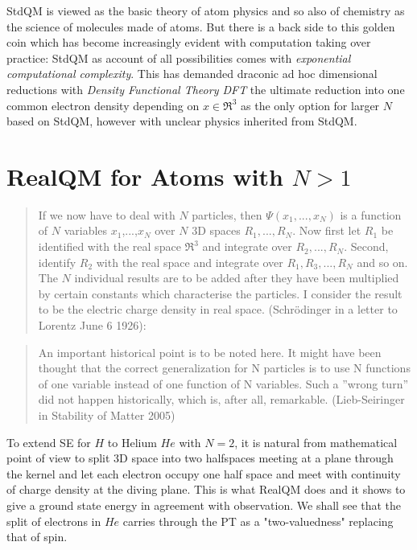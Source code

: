 \documentclass[11pt]{article} %
\begin{document}
StdQM is viewed as the basic theory of atom physics and so also of chemistry as the science of molecules made of atoms.  But there is a back side to this golden coin which has become increasingly evident with computation taking over practice: StdQM as account of all possibilities comes with  \emph{exponential computational complexity}. This  
has demanded draconic ad hoc dimensional reductions with \emph{Density Functional Theory DFT} the ultimate reduction into one common electron density depending on $x\in\Re^3$ as the only option for larger $N$ based on StdQM,  however with unclear physics inherited from StdQM.

\section{RealQM for Atoms with $N>1$}
\begin{quote}
If we now have to deal with $N$ particles, then $\Psi (x_1,...,x_N )$ is a function of $N$ variables $x_1$,...,$x_N$  over $N$ 3D spaces $R_1,...,R_N$.  Now first let $R_1$ be identified with the real space $\Re^3$ and integrate over $R_2,...,R_N$. Second, identify $R_2$ with the real space and integrate over $R_1, R_3,...,R_N$ and so on. 
The $N$ individual results are to be added after they have been multiplied by certain constants which characterise the particles.  I consider the result to be the electric charge density in real space.  (Schr\"odinger in a letter to Lorentz June 6  1926):
\end{quote}
\begin{quote} An important historical point is to be noted here. It might have been thought that the correct generalization for N particles is to use N functions of one variable instead of one function of N variables. 
Such a ”wrong turn” did not happen historically,  which is,  after all,  remarkable. (Lieb-Seiringer in Stability of Matter 2005)
\end{quote}

To extend SE for $H$ to Helium $He$ with $N=2$,  it is natural from mathematical point of view to split 3D space into two halfspaces meeting at a plane through the kernel and let each electron occupy one half space and meet with continuity of charge density at the diving plane.  This is what RealQM does and it shows to give a ground state energy in agreement with observation.  We shall see that the split of electrons in $He$ carries through the PT as a "two-valuedness" replacing that of spin.
\end{document}
